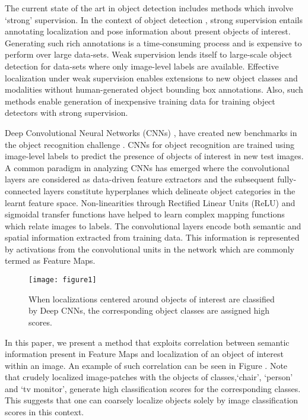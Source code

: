 \documentclass[runningheads]{llncs}
\begin{document}
The current state of the art in object detection includes methods which involve `strong' supervision. In the context of  object detection , strong supervision entails annotating  localization and pose information about present objects of interest. Generating such rich annotations is a time-consuming process and is expensive to perform over large data-sets. Weak supervision lends itself to large-scale object detection for data-sets where only image-level labels are available. Effective localization under weak supervision enables extensions to new object classes and modalities without human-generated object bounding box annotations. Also, such methods enable generation of inexpensive training data for training object detectors with strong supervision.

Deep Convolutional Neural Networks  (CNNs) \cite{szegedy2015going}, \cite{krizhevsky2012imagenet} have created new benchmarks in the object recognition challenge \cite{deng2009imagenet}. CNNs for object recognition are trained using image-level labels to predict the presence of objects of interest in new test images.  A common paradigm in analyzing CNNs has emerged where the convolutional layers are considered as data-driven feature extractors and the subsequent fully-connected layers constitute hyperplanes which delineate object categories in the learnt feature space. Non-linearities through Rectified Linear Units (ReLU) and sigmoidal transfer functions have helped to learn complex mapping functions which relate images to labels.  The convolutional layers encode both semantic and spatial information extracted from training data. This information is represented by  activations from the convolutional units in the network which are commonly termed as Feature Maps.

\begin{figure}
\begin{center}
\texttt{[image: figure1]}
\end{center}
   \caption{When localizations centered around objects of interest are classified by Deep CNNs, the corresponding object classes are assigned high scores.}
\label{fig:localization_bias}
\end{figure}

In this paper, we present a method that exploits  correlation between semantic information present in Feature Maps and  localization of an object of interest within an  image. An example of such correlation can be seen in Figure . Note that crudely localized image-patches with the objects of classes,`chair', `person' and `tv monitor', generate high classification scores for the corresponding classes. This suggests that one can coarsely localize objects solely by image classification scores in this context.
\end{document}
